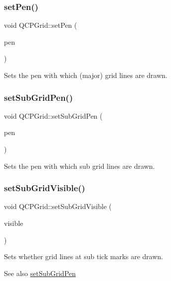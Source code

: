 \subsubsection{\texorpdfstring{set\+Pen()}{setPen()}}
{\footnotesize\ttfamily void Q\+C\+P\+Grid\+::set\+Pen (\begin{DoxyParamCaption}\item[{const Q\+Pen \&}]{pen }\end{DoxyParamCaption})}

Sets the pen with which (major) grid lines are drawn. \hypertarget{class_q_c_p_grid_a9edd3593f384d1f0b0202a39cef4453d}{}\label{class_q_c_p_grid_a9edd3593f384d1f0b0202a39cef4453d} 
\subsubsection{\texorpdfstring{set\+Sub\+Grid\+Pen()}{setSubGridPen()}}
{\footnotesize\ttfamily void Q\+C\+P\+Grid\+::set\+Sub\+Grid\+Pen (\begin{DoxyParamCaption}\item[{const Q\+Pen \&}]{pen }\end{DoxyParamCaption})}

Sets the pen with which sub grid lines are drawn. \hypertarget{class_q_c_p_grid_ad4ad6bf714ec45e08845456355a1b700}{}\label{class_q_c_p_grid_ad4ad6bf714ec45e08845456355a1b700} 
\subsubsection{\texorpdfstring{set\+Sub\+Grid\+Visible()}{setSubGridVisible()}}
{\footnotesize\ttfamily void Q\+C\+P\+Grid\+::set\+Sub\+Grid\+Visible (\begin{DoxyParamCaption}\item[{bool}]{visible }\end{DoxyParamCaption})}

Sets whether grid lines at sub tick marks are drawn.

\begin{DoxySeeAlso}{See also}
\hyperlink{class_q_c_p_grid_a9edd3593f384d1f0b0202a39cef4453d}{set\+Sub\+Grid\+Pen} 
\end{DoxySeeAlso}
\hypertarget{class_q_c_p_grid_a209f40fdb252397b418b82d3494d8ea0}{}\label{class_q_c_p_grid_a209f40fdb252397b418b82d3494d8ea0} 
